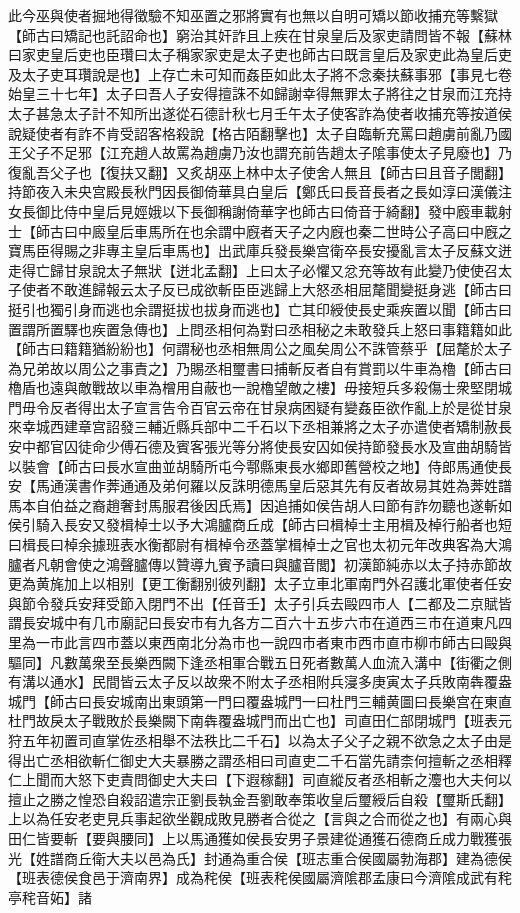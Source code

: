 此今巫與使者掘地得徵驗不知巫置之邪將實有也無以自明可矯以節收捕充等繫獄【師古曰矯記也託詔命也】窮治其奸詐且上疾在甘泉皇后及家吏請問皆不報【蘇林曰家吏皇后吏也臣瓚曰太子稱家家吏是太子吏也師古曰既言皇后及家吏此為皇后吏及太子吏耳瓚說是也】上存亡未可知而姦臣如此太子將不念秦扶蘇事邪【事見七卷始皇三十七年】太子曰吾人子安得擅誅不如歸謝幸得無罪太子將往之甘泉而江充持太子甚急太子計不知所出遂從石德計秋七月壬午太子使客詐為使者收捕充等按道侯說疑使者有詐不肯受詔客格殺說【格古陌翻擊也】太子自臨斬充罵曰趙虜前亂乃國王父子不足邪【江充趙人故罵為趙虜乃汝也謂充前告趙太子隂事使太子見廢也】乃復亂吾父子也【復扶又翻】又炙胡巫上林中太子使舍人無且【師古曰且音子閭翻】持節夜入未央宫殿長秋門因長御倚華具白皇后【鄭氏曰長音長者之長如淳曰漢儀注女長御比侍中皇后見娙娥以下長御稱謝倚華字也師古曰倚音于綺翻】發中廏車載射士【師古曰中廄皇后車馬所在也余謂中廐者天子之内廐也秦二世時公子高曰中廐之寶馬臣得賜之非專主皇后車馬也】出武庫兵發長樂宫衛卒長安擾亂言太子反蘇文迸走得亡歸甘泉說太子無狀【迸北孟翻】上曰太子必懼又忿充等故有此變乃使使召太子使者不敢進歸報云太子反已成欲斬臣臣逃歸上大怒丞相屈氂聞變挺身逃【師古曰挺引也獨引身而逃也余謂挺拔也拔身而逃也】亡其印綬使長史乘疾置以聞【師古曰置謂所置驛也疾置急傳也】上問丞相何為對曰丞相秘之未敢發兵上怒曰事籍籍如此【師古曰籍籍猶紛紛也】何謂秘也丞相無周公之風矣周公不誅管蔡乎【屈氂於太子為兄弟故以周公之事責之】乃賜丞相璽書曰捕斬反者自有賞罰以牛車為櫓【師古曰櫓盾也遠與敵戰故以車為橧用自蔽也一說櫓望敵之樓】毋接短兵多殺傷士衆堅閉城門毋令反者得出太子宣言告令百官云帝在甘泉病困疑有變姦臣欲作亂上於是從甘泉來幸城西建章宫詔發三輔近縣兵部中二千石以下丞相兼將之太子亦遣使者矯制赦長安中都官囚徒命少傅石德及賓客張光等分將使長安囚如侯持節發長水及宣曲胡騎皆以裝會【師古曰長水宣曲並胡騎所屯今鄠縣東長水鄉即舊營校之地】侍郎馬通使長安【馬通漢書作莾通通及弟何羅以反誅明德馬皇后惡其先有反者故易其姓為莾姓譜馬本自伯益之裔趙奢封馬服君後因氏焉】因追捕如侯告胡人曰節有詐勿聽也遂斬如侯引騎入長安又發楫棹士以予大鴻臚商丘成【師古曰楫棹士主用楫及棹行船者也短曰楫長曰棹余據班表水衡都尉有楫棹令丞蓋掌楫棹士之官也太初元年改典客為大鴻臚者凡朝會使之鴻聲臚傳以贊導九賓予讀曰與臚音閭】初漢節純赤以太子持赤節故更為黄旄加上以相别【更工衡翻别彼列翻】太子立車北軍南門外召護北軍使者任安與節令發兵安拜受節入閉門不出【任音壬】太子引兵去毆四市人【二都及二京賦皆謂長安城中有几市廟記曰長安市有九各方二百六十五步六市在道西三市在道東凡四里為一市此言四市蓋以東西南北分為市也一說四市者東市西市直市柳市師古曰毆與驅同】凡數萬衆至長樂西闕下逢丞相軍合戰五日死者數萬人血流入溝中【街衢之側有溝以通水】民間皆云太子反以故衆不附太子丞相附兵寖多庚寅太子兵敗南犇覆盎城門【師古曰長安城南出東頭第一門曰覆盎城門一曰杜門三輔黄圖曰長樂宫在東直杜門故戾太子戰敗於長樂闕下南犇覆盎城門而出亡也】司直田仁部閉城門【班表元狩五年初置司直掌佐丞相舉不法秩比二千石】以為太子父子之親不欲急之太子由是得出亡丞相欲斬仁御史大夫暴勝之謂丞相曰司直吏二千石當先請柰何擅斬之丞相釋仁上聞而大怒下吏責問御史大夫曰【下遐稼翻】司直縱反者丞相斬之灋也大夫何以擅止之勝之惶恐自殺詔遣宗正劉長執金吾劉敢奉策收皇后璽綬后自殺【璽斯氏翻】上以為任安老吏見兵事起欲坐觀成敗見勝者合從之【言與之合而從之也】有兩心與田仁皆要斬【要與腰同】上以馬通獲如侯長安男子景建從通獲石德商丘成力戰獲張光【姓譜商丘衛大夫以邑為氏】封通為重合侯【班志重合侯國屬勃海郡】建為德侯【班表德侯食邑于濟南界】成為秺侯【班表秺侯國屬濟隂郡孟康曰今濟隂成武有秺亭秺音妬】諸